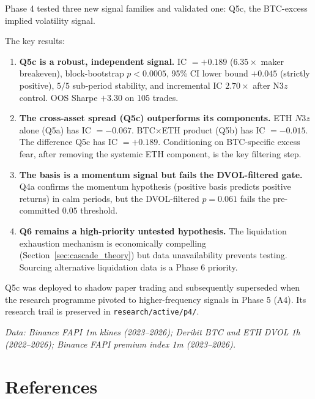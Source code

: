 \documentclass[12pt, a4paper]{article}
\theoremstyle{plain}
\theoremstyle{definition}
\begin{document}
Phase 4 tested three new signal families and validated one: Q5c, the
BTC-excess implied volatility signal.

The key results:

\begin{enumerate}
  \item \textbf{Q5c is a robust, independent signal.}
        IC $= +0.189$ ($6.35\times$ maker breakeven), block-bootstrap
        $p < 0.0005$, 95\% CI lower bound $+0.045$ (strictly positive),
        $5/5$ sub-period stability, and incremental IC $2.70\times$
        after N3$z$ control.  OOS Sharpe $+3.30$ on 105 trades.

  \item \textbf{The cross-asset spread (Q5c) outperforms its components.}
        ETH $N3z$ alone (Q5a) has IC $= -0.067$.  BTC$\times$ETH product
        (Q5b) has IC $= -0.015$.  The difference Q5c has IC $= +0.189$.
        Conditioning on BTC-specific excess fear, after removing the
        systemic ETH component, is the key filtering step.

  \item \textbf{The basis is a momentum signal but fails the DVOL-filtered
        gate.}  Q4a confirms the momentum hypothesis (positive basis
        predicts positive returns) in calm periods, but the DVOL-filtered
        $p = 0.061$ fails the pre-committed $0.05$ threshold.

  \item \textbf{Q6 remains a high-priority untested hypothesis.}
        The liquidation exhaustion mechanism is economically compelling
        (Section~\ref{sec:cascade_theory}) but data unavailability
        prevents testing.  Sourcing alternative liquidation data is a
        Phase 6 priority.
\end{enumerate}

Q5c was deployed to shadow paper trading and subsequently superseded when
the research programme pivoted to higher-frequency signals in Phase 5
(A4).  Its research trail is preserved in \texttt{research/active/p4/}.

\vspace{1em}
\noindent\textit{Data: Binance FAPI 1m klines (2023--2026); Deribit
BTC and ETH DVOL 1h (2022--2026); Binance FAPI premium index 1m
(2023--2026).}

\section*{References}
\begingroup
\setlength{\parindent}{-2em}
\setlength{\leftskip}{2em}
\setlength{\parskip}{6pt}
\small
\end{document}
